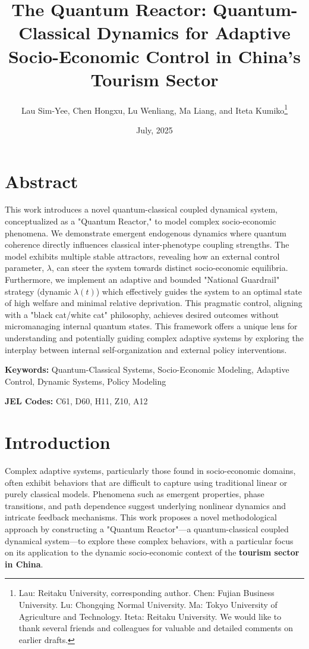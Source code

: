 \documentclass[9pt]{article}
\title{The Quantum Reactor: Quantum-Classical Dynamics for Adaptive Socio-Economic Control in China's Tourism Sector}
\author{Lau Sim-Yee, Chen Hongxu, Lu Wenliang, Ma Liang, and Iteta Kumiko\thanks{
Lau: Reitaku University, corresponding author. Chen: Fujian Business University. Lu: Chongqing Normal University. Ma: Tokyo University of Agriculture and Technology. Iteta: Reitaku University. We would like to thank several friends and colleagues for valuable and detailed comments on earlier drafts.}}
\date{July, 2025}
\begin{document}
\singlespacing 

\maketitle
\section*{Abstract}
\noindent This work introduces a novel quantum-classical coupled dynamical system, conceptualized as a "Quantum Reactor," to model complex socio-economic phenomena. We demonstrate emergent endogenous dynamics where quantum coherence directly influences classical inter-phenotype coupling strengths. The model exhibits multiple stable attractors, revealing how an external control parameter, $\lambda$, can steer the system towards distinct socio-economic equilibria. Furthermore, we implement an adaptive and bounded "National Guardrail" strategy (dynamic $\lambda(t)$) which effectively guides the system to an optimal state of high welfare and minimal relative deprivation. This pragmatic control, aligning with a "black cat/white cat" philosophy, achieves desired outcomes without micromanaging internal quantum states. This framework offers a unique lens for understanding and potentially guiding complex adaptive systems by exploring the interplay between internal self-organization and external policy interventions.

\vspace{1em}
\noindent\textbf{Keywords:} Quantum-Classical Systems, Socio-Economic Modeling, Adaptive Control, Dynamic Systems, Policy Modeling

\vspace{1em}
\noindent\textbf{JEL Codes:} C61, D60, H11, Z10, A12

\vspace{0.5em} %

\section{Introduction}
Complex adaptive systems, particularly those found in socio-economic domains, often exhibit behaviors that are difficult to capture using traditional linear or purely classical models. Phenomena such as emergent properties, phase transitions, and path dependence suggest underlying nonlinear dynamics and intricate feedback mechanisms. This work proposes a novel methodological approach by constructing a "Quantum Reactor"—a quantum-classical coupled dynamical system—to explore these complex behaviors, with a particular focus on its application to the dynamic socio-economic context of the \textbf{tourism sector in China}.
\end{document}
